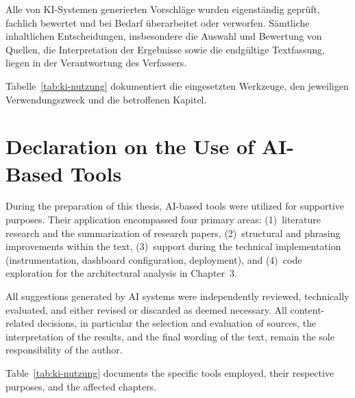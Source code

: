 Alle von KI-Systemen generierten Vorschläge wurden eigenständig geprüft, fachlich bewertet und bei Bedarf überarbeitet oder verworfen. Sämtliche inhaltlichen Entscheidungen, insbesondere die Auswahl und Bewertung von Quellen, die Interpretation der Ergebnisse sowie die endgültige Textfassung, liegen in der Verantwortung des Verfassers.

Tabelle~\ref{tab:ki-nutzung} dokumentiert die eingesetzten Werkzeuge, den jeweiligen Verwendungszweck und die betroffenen Kapitel.

\section{Declaration on the Use of AI-Based Tools}

During the preparation of this thesis, AI-based tools were utilized for supportive purposes. Their application encompassed four primary areas: (1)~literature research and the summarization of research papers, (2)~structural and phrasing improvements within the text, (3)~support during the technical implementation (instrumentation, dashboard configuration, deployment), and (4)~code exploration for the architectural analysis in Chapter~3.

All suggestions generated by AI systems were independently reviewed, technically evaluated, and either revised or discarded as deemed necessary. All content-related decisions, in particular the selection and evaluation of sources, the interpretation of the results, and the final wording of the text, remain the sole responsibility of the author.

Table~\ref{tab:ki-nutzung} documents the specific tools employed, their respective purposes, and the affected chapters.

\newpage

